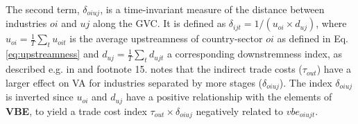 \documentclass[a4paper]{article}
\begin{document}
The second term, $\delta_{oiuj}$, is a time-invariant measure of the distance between industries $oi$ and $uj$ along the GVC. It is defined as $\delta_{ijt} = 1/(u_{oi}\times d_{uj})$, where $u_{oi} = \frac{1}{T}\sum_t u_{oit}$ is the average upstreamness of country-sector $oi$ as defined in Eq. \ref{eq:upstreamness} and $d_{uj} = \frac{1}{T}\sum_t d_{ujt}$ a corresponding downstremness index, as described e.g. in \citet{antras2022global} and footnote 15. \citet{Kummritz20161} notes that the indirect trade costs ($\tau_{out}$) have a larger effect on VA for industries separated by more stages ($\delta_{oiuj}$). The index $\delta_{oiuj}$ is inverted since $u_{oi}$ and $d_{uj}$ have a positive relationship with the elements of \textbf{VBE}, to yield a trade cost index $\tau_{out}\times \delta_{oiuj}$ negatively related to $vbe_{oiujt}$. \newline 
\end{document}
